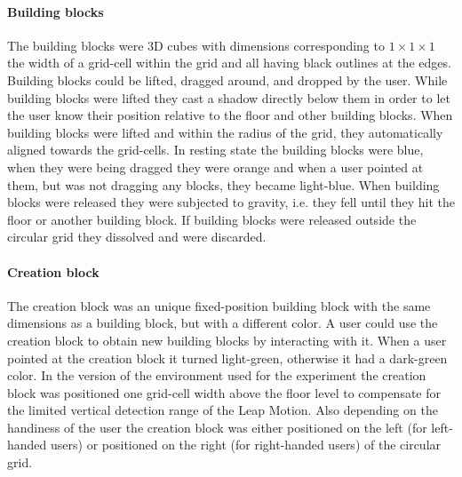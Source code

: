\paragraph{Building blocks}
The building blocks were 3D cubes with dimensions corresponding to $1\times 1\times 1$ the width of a grid-cell within the grid and all having black outlines at the edges. Building blocks could be lifted, dragged around, and dropped by the user. While building blocks were lifted they cast a shadow directly below them in order to let the user know their position relative to the floor and other building blocks. When building blocks were lifted and within the radius of the grid, they automatically aligned towards the grid-cells. In resting state the building blocks were blue, when they were being dragged they were orange and when a user pointed at them, but was not dragging any blocks, they became light-blue. When building blocks were released they were subjected to gravity, i.e. they fell until they hit the floor or another building block. If building blocks were released outside the circular grid they dissolved and were discarded.

\paragraph{Creation block}
The creation block was an unique fixed-position building block with the same dimensions as a building block, but with a different color. A user could use the creation block to obtain new building blocks by interacting with it. When a user pointed at the creation block it turned light-green, otherwise it had a dark-green color. In the version of the environment used for the experiment the creation block was positioned one grid-cell width above the floor level to compensate for the limited vertical detection range of the Leap Motion. Also depending on the handiness of the user the creation block was either positioned on the left (for left-handed users) or positioned on the right (for right-handed users) of the circular grid.

